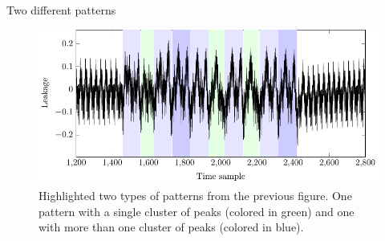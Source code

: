 \begin{frame}{Two different patterns}
    \begin{figure}[H]
    \centering
    \includegraphics{fig/SPA_on_RSA_highlighted_peaks.pdf}
    \caption{Highlighted two types of patterns from the previous figure. One pattern with a single cluster of peaks (colored in green) and one with more than one cluster of peaks (colored in blue).}
\end{figure}
\end{frame}

